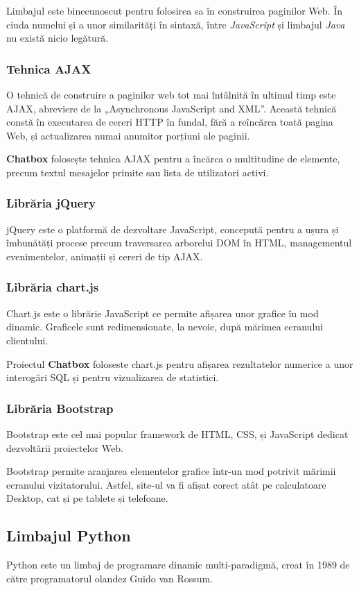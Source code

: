 \documentclass[12pt,a4paper]{article}
\begin{document}
Limbajul este binecunoscut pentru folosirea sa în construirea paginilor Web. În ciuda numelui și a unor similarități în sintaxă, între \textit{JavaScript} și limbajul \textit{Java} nu există nicio legătură.

\subsubsection{Tehnica AJAX}
O tehnică de construire a paginilor web tot mai întâlnită în ultimul timp este AJAX, abreviere de la „Asynchronous JavaScript and XML”. Această tehnică constă în executarea de cereri HTTP în fundal, fără a reîncărca toată pagina Web, și actualizarea numai anumitor porțiuni ale paginii.

\textbf{Chatbox} folosește tehnica AJAX pentru a încărca o multitudine de
elemente, precum textul mesajelor primite sau lista de utilizatori activi. 

\subsubsection{Librăria jQuery}
jQuery\citep{jquery} este o platformă de dezvoltare JavaScript, concepută pentru a ușura și îmbunătăți procese precum traversarea arborelui DOM\citep{dom} în HTML, managementul evenimentelor, animații și cereri de tip AJAX.

\subsubsection{Librăria chart.js}
Chart.js\cite{chartjs} este o librărie JavaScript ce permite afișarea 
unor grafice în mod dinamic. Graficele sunt redimensionate, la nevoie, după 
mărimea ecranului clientului. 

Proiectul \textbf{Chatbox} foloseste chart.js pentru afișarea rezultatelor
numerice a unor interogări SQL și pentru vizualizarea de statistici.

\subsubsection{Librăria Bootstrap}
Bootstrap este cel mai popular framework de HTML, CSS, și JavaScript dedicat dezvoltării proiectelor Web. 

Bootstrap permite aranjarea elementelor grafice într-un mod potrivit mărimii ecranului vizitatorului. Astfel, site-ul va fi afișat corect atât pe calculatoare Desktop, cat și pe tablete și telefoane.

\subsection{Limbajul Python}
Python este un limbaj de programare dinamic multi-paradigmă\cite{python}, creat în 1989 de către programatorul olandez Guido van Rossum\cite{pythonWiki}.
\end{document}

